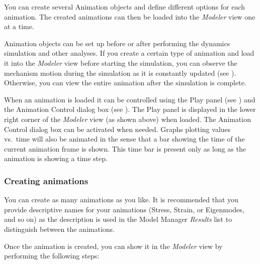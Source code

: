 You can create several Animation objects and define different options for each
animation. The created animations can then be loaded into the {\sl Modeler}
view one at a time.

Animation objects can be set up before or after performing the dynamics
simulation and other analyses. If you create a certain type of animation and
load it into the {\sl Modeler} view before starting the simulation, you can
observe the mechanism motion during the simulation as it is constantly updated
(see ).
Otherwise, you can view the entire animation after the simulation is complete.

When an animation is loaded it can be controlled using the Play panel
(see ) and the Animation Control dialog box
(see ).
The Play panel is displayed in the lower right corner of the {\sl Modeler} view
(as shown above) when loaded.
The Animation Control dialog box can be activated when needed.
Graphs plotting values vs.\ time will also be animated in the sense that
a bar showing the time of the current animation frame is shown.
This time bar is present only as long as the animation is showing a time step.




\subsubsection{Creating animations}

You can create as many animations as you like. It is recommended that you
provide descriptive names for your animations (Stress, Strain, or Eigenmodes,
and so on) as the description is used in the Model Manager {\sl Results} list
to distinguish between the animations.



Once the animation is created, you can show it in the {\sl Modeler} view by
performing the following steps:

